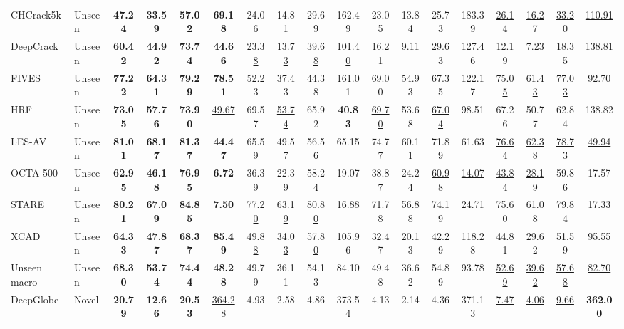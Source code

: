 \begin{table}[t]
{\begin{tabular}{llcccc|cccc|cccc|cccc}
\midrule
CHCrack5k & Unseen & \textbf{47.24} & \textbf{33.59} & \textbf{57.02} & \textbf{69.18} & 24.06 & 14.81 & 29.69 & 162.49 & 23.05 & 13.84 & 25.73 & 183.39 & \underline{26.14} & \underline{16.27} & \underline{33.20} & \underline{110.91} \\
DeepCrack & Unseen & \textbf{60.42} & \textbf{44.92} & \textbf{73.74} & \textbf{44.66} & \underline{23.38} & \underline{13.73} & \underline{39.68} & \underline{101.40} & 16.21 & 9.11 & 29.63 & 127.46 & 12.19 & 7.23 & 18.35 & 138.81 \\
FIVES & Unseen & \textbf{77.22} & \textbf{64.31} & \textbf{79.29} & \textbf{78.51} & 52.23 & 37.43 & 44.38 & 161.01 & 69.00 & 54.93 & 67.35 & 122.17 & \underline{75.05} & \underline{61.43} & \underline{77.03} & \underline{92.70} \\
HRF & Unseen & \textbf{73.05} & \textbf{57.76} & \textbf{73.90} & \underline{49.67} & 69.57 & \underline{53.74} & 65.92 & \textbf{40.83} & \underline{69.70} & 53.68 & \underline{67.04} & 98.51 & 67.26 & 50.77 & 62.84 & 138.82 \\
LES-AV & Unseen & \textbf{81.01} & \textbf{68.17} & \textbf{81.37} & \textbf{44.47} & 65.59 & 49.57 & 56.56 & 65.15 & 74.77 & 60.11 & 71.89 & 61.63 & \underline{76.64} & \underline{62.38} & \underline{78.73} & \underline{49.94} \\
OCTA-500 & Unseen & \textbf{62.95} & \textbf{46.18} & \textbf{76.95} & \textbf{6.72} & 36.39 & 22.39 & 58.24 & 19.07 & 38.87 & 24.24 & \underline{60.98} & \underline{14.07} & \underline{43.84} & \underline{28.19} & 59.86 & 17.57 \\
STARE & Unseen & \textbf{80.21} & \textbf{67.09} & \textbf{84.85} & \textbf{7.50} & \underline{77.20} & \underline{63.19} & \underline{80.80} & \underline{16.88} & 71.78 & 56.88 & 74.19 & 24.71 & 75.60 & 61.08 & 79.84 & 17.33 \\
XCAD & Unseen & \textbf{64.33} & \textbf{47.87} & \textbf{68.37} & \textbf{85.49} & \underline{49.88} & \underline{34.03} & \underline{57.80} & 105.96 & 32.47 & 20.13 & 42.29 & 118.28 & 44.81 & 29.62 & 51.59 & \underline{95.55} \\
\midrule
Unseen macro & Unseen & \textbf{68.30} & \textbf{53.74} & \textbf{74.44} & \textbf{48.28} & 49.79 & 36.11 & 54.13 & 84.10 & 49.48 & 36.62 & 54.89 & 93.78 & \underline{52.69} & \underline{39.62} & \underline{57.68} & \underline{82.70} \\
\midrule
DeepGlobe & Novel & \textbf{20.79} & \textbf{12.66} & \textbf{20.53} & \underline{364.28} & 4.93 & 2.58 & 4.86 & 373.54 & 4.13 & 2.14 & 4.36 & 371.13 & \underline{7.47} & \underline{4.06} & \underline{9.66} & \textbf{362.00} \\

\end{tabular}}
\end{table}
